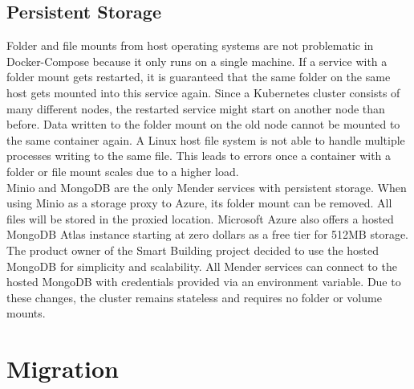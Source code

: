 \subsection{Persistent Storage}
Folder and file mounts from host operating systems are not problematic in Docker-Compose because it only runs on a single machine. If a service with a folder mount gets restarted, it is guaranteed that the same folder on the same host gets mounted into this service again. Since a Kubernetes cluster consists of many different nodes, the restarted service might start on another node than before. Data written to the folder mount on the old node cannot be mounted to the same container again. A Linux host file system is not able to handle multiple processes writing to the same file. This leads to errors once a container with a folder or file mount scales due to a higher load.\\
Minio and MongoDB are the only Mender services with persistent storage. When using Minio as a storage proxy to Azure, its folder mount can be removed. All files will be stored in the proxied location. Microsoft Azure also offers a hosted MongoDB Atlas instance starting at zero dollars as a free tier for 512MB storage.\cite{azuremongodbatlas} The product owner of the Smart Building project decided to use the hosted MongoDB for simplicity and scalability. All Mender services can connect to the hosted MongoDB with credentials provided via an environment variable. Due to these changes, the cluster remains stateless and requires no folder or volume mounts.

\section{Migration}
